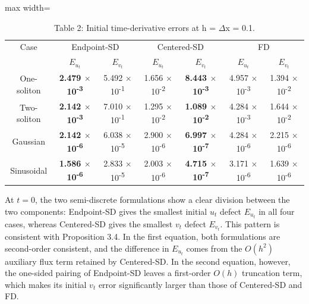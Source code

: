 \documentclass{article}
\theoremstyle{plain}
\theoremstyle{definition}
\begin{document}
\begin{table}[!htbp]
\centering
\caption*{Table 2: Initial time-derivative errors at h = \(\Delta\)x = 0.1.}
\normalsize
\setlength{\tabcolsep}{6pt}
\renewcommand{\arraystretch}{1.25}\setlength{\extrarowheight}{1pt}
\setlength{\tabcolsep}{4pt}
\begin{adjustbox}{max width=\linewidth}
\begin{tabular}{ccccccc}

\hline
\multicolumn{1}{c}{Case} & \multicolumn{2}{c}{Endpoint-SD} & \multicolumn{2}{c}{Centered-SD} & \multicolumn{2}{c}{FD} \\
 & \multicolumn{1}{c}{\(E_{u_t}\)} & \multicolumn{1}{c}{\(E_{v_t}\)} & \multicolumn{1}{c}{\(E_{u_t}\)} & \multicolumn{1}{c}{\(E_{v_t}\)} & \multicolumn{1}{c}{\(E_{u_t}\)} & \multicolumn{1}{c}{\(E_{v_t}\)} \\
\hline
One-soliton & \textbf{2.479 \(\times\) 10\textsuperscript{-3}} & 5.492 \(\times\) 10\textsuperscript{-1} & 1.656 \(\times\) 10\textsuperscript{-2} & \textbf{8.443 \(\times\) 10\textsuperscript{-3}} & 4.957 \(\times\) 10\textsuperscript{-3} & 1.394 \(\times\) 10\textsuperscript{-2} \\
Two-soliton & \textbf{2.142 \(\times\) 10\textsuperscript{-3}} & 7.010 \(\times\) 10\textsuperscript{-1} & 1.295 \(\times\) 10\textsuperscript{-2} & \textbf{1.089 \(\times\) 10\textsuperscript{-2}} & 4.284 \(\times\) 10\textsuperscript{-3} & 1.644 \(\times\) 10\textsuperscript{-2} \\
Gaussian & \textbf{2.142 \(\times\) 10\textsuperscript{-6}} & 6.038 \(\times\) 10\textsuperscript{-5} & 2.900 \(\times\) 10\textsuperscript{-6} & \textbf{6.997 \(\times\) 10\textsuperscript{-7}} & 4.284 \(\times\) 10\textsuperscript{-6} & 2.215 \(\times\) 10\textsuperscript{-6} \\
Sinusoidal & \textbf{1.586 \(\times\) 10\textsuperscript{-6}} & 2.833 \(\times\) 10\textsuperscript{-5} & 2.003 \(\times\) 10\textsuperscript{-6} & \textbf{4.715 \(\times\) 10\textsuperscript{-7}} & 3.171 \(\times\) 10\textsuperscript{-6} & 1.639 \(\times\) 10\textsuperscript{-6} \\
\hline
\end{tabular}
\end{adjustbox}
\end{table}

At \(t=0\), the two semi-discrete formulations show a clear division between the two components: Endpoint-SD gives the smallest initial \(u_t\) defect \(E_{u_t}\) in all four cases, whereas Centered-SD gives the smallest \(v_t\) defect \(E_{v_t}\). This pattern is consistent with Proposition 3.4. In the first equation, both formulations are second-order consistent, and the difference in \(E_{u_t}\) comes from the \(O(h^2)\) auxiliary flux term retained by Centered-SD. In the second equation, however, the one-sided pairing of Endpoint-SD leaves a first-order \(O(h)\) truncation term, which makes its initial \(v_t\) error significantly larger than those of Centered-SD and FD.
\end{document}
